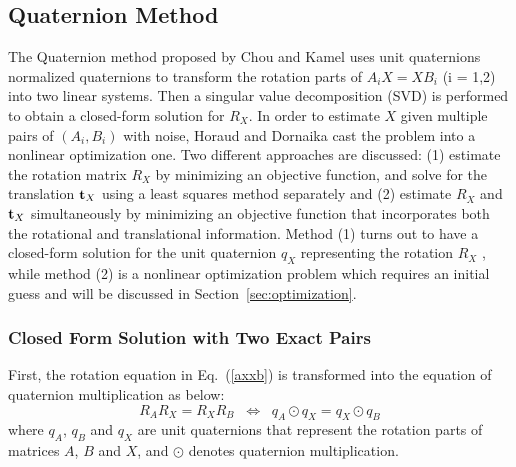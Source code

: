 \documentclass[twocolumn,10pt]{asme2ej}
\newcommand{\ttt}{{\bf t}}
\begin{document}
\subsection{Quaternion Method }
\label{sec:quats}
The Quaternion method proposed by Chou and Kamel \cite{chou1988quaternions,chou1991finding} uses unit quaternions normalized quaternions to transform the rotation parts of $A_{i}X = XB_{i}$ (i = 1,2) into two linear systems. Then a singular value decomposition (SVD) is performed to obtain a closed-form solution for $R_{X}$. In order to estimate $X$ given multiple pairs of $(A_{i}, B_{i})$ with noise, Horaud and Dornaika \cite{horaud1995hand} cast the problem into a nonlinear optimization one. Two different approaches are discussed: (1) estimate the rotation matrix $R_{X}$ by minimizing an objective function, and solve for the translation $\ttt_{X}$ using a least squares method separately and (2) estimate $R_{X}$ and $\ttt_{X}$ simultaneously by minimizing an objective function that incorporates both the rotational and translational information. Method (1) turns out to have a closed-form solution for the unit quaternion $q_{X}$ representing the rotation $R_{X}$%
, while method (2) is a nonlinear optimization problem which requires an initial guess and will be discussed in Section~\ref{sec:optimization}. 
\subsubsection{Closed Form Solution with Two Exact Pairs}
\label{sec:quat_method}
First, the rotation equation in Eq.~(\ref{axxb}) is transformed into the equation of quaternion multiplication as below:
\begin{equation}
R_{A}R_{X} = R_{X}R_{B} 
\; \;
\Leftrightarrow
\; \;
q_{A}\odot q_{X} = q_{X}\odot q_{B}
\label{Quaternion}
\end{equation} 
where $q_{A}$, $q_{B}$ and $q_{X}$ are
unit quaternions that represent the rotation parts of matrices $A$, $B$ and $X$, and $\odot$ denotes quaternion multiplication.
\end{document}
